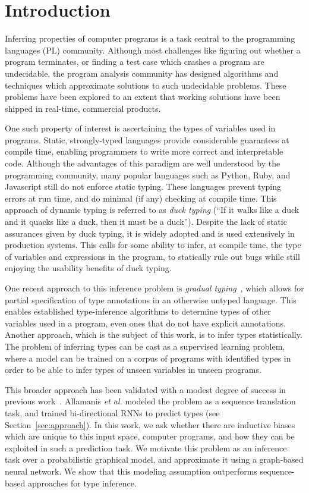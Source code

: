 \section{Introduction}
\label{sec:introduction}
Inferring properties of computer programs is a task central to the programming languages (PL) community.
Although most challenges like figuring out whether a program terminates, or finding a test case which crashes a program are undecidable, the program analysis community has designed algorithms and techniques which approximate solutions to such undecidable problems.
These problems have been explored to an extent that working solutions have been shipped in real-time, commercial products.

One such property of interest is ascertaining the types of variables used in programs.
Static, strongly-typed languages provide considerable guarantees at compile time, enabling programmers to write more correct and interpretable code.
Although the advantages of this paradigm are well understood by the programming community, many popular languages such as Python, Ruby, and Javascript still do not enforce static typing.
These languages prevent typing errors at run time, and do minimal (if any) checking at compile time.
This approach of dynamic typing is referred to as \textit{duck typing} (``If it walks like a duck and it quacks like a duck, then it must be a duck'').
Despite the lack of static assurances given by duck typing, it is widely adopted and is used extensively in production systems.
This calls for some ability to infer, at compile time, the type of variables and expressions in the program, to statically rule out bugs while still enjoying the usability benefits of duck typing.

One recent approach to this inference problem is \emph{gradual typing}~\cite{siek2006gradual}, which allows for partial specification of type annotations in an otherwise untyped language.
This enables established type-inference algorithms to determine types of other variables used in a program, even ones that do not have explicit annotations.
Another approach, which is the subject of this work, is to infer types statistically.
The problem of inferring types can be cast as a supervised learning problem, where a model can be trained on a corpus of programs with identified types in order to be able to infer types of unseen variables in unseen programs.

This broader approach has been validated with a modest degree of success in previous work~\cite{hellendoorn2018deep}.
Allamanis \textit{et al.} modeled the problem as a sequence translation task, and trained bi-directional RNNs to predict types (see Section~\ref{sec:approach}).
In this work, we ask whether there are inductive biases which are unique to this input space, computer programs, and how they can be exploited in such a prediction task.
We motivate this problem as an inference task over a probabilistic graphical model, and approximate it using a graph-based neural network.
We show that this modeling assumption outperforms sequence-based approaches for type inference.